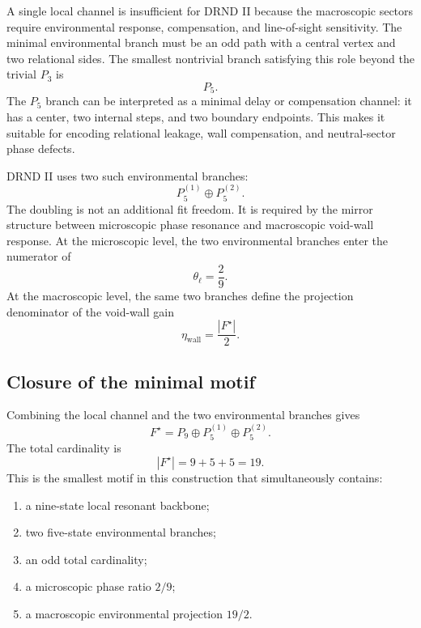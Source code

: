 \documentclass[12pt]{iopart}
\begin{document}
A single local channel is insufficient for DRND II because the macroscopic sectors require environmental response, compensation, and line-of-sight sensitivity. The minimal environmental branch must be an odd path with a central vertex and two relational sides. The smallest nontrivial branch satisfying this role beyond the trivial \(P_3\) is
\begin{equation}
P_5.
\end{equation}
The \(P_5\) branch can be interpreted as a minimal delay or compensation channel: it has a center, two internal steps, and two boundary endpoints. This makes it suitable for encoding relational leakage, wall compensation, and neutral-sector phase defects.

DRND II uses two such environmental branches:
\begin{equation}
P_5^{(1)}\oplus P_5^{(2)}.
\end{equation}
The doubling is not an additional fit freedom. It is required by the mirror structure between microscopic phase resonance and macroscopic void-wall response. At the microscopic level, the two environmental branches enter the numerator of
\begin{equation}
\theta_\ell=\frac{2}{9}.
\end{equation}
At the macroscopic level, the same two branches define the projection denominator of the void-wall gain
\begin{equation}
\eta_{\mathrm{wall}}
=
\frac{|F^\star|}{2}.
\end{equation}

\subsection{Closure of the minimal motif}

Combining the local channel and the two environmental branches gives
\begin{equation}
F^\star
=
P_9\oplus P_5^{(1)}\oplus P_5^{(2)}.
\end{equation}
The total cardinality is
\begin{equation}
|F^\star|
=
9+5+5
=
19.
\end{equation}
This is the smallest motif in this construction that simultaneously contains:
\begin{enumerate}
    \item a nine-state local resonant backbone;
    \item two five-state environmental branches;
    \item an odd total cardinality;
    \item a microscopic phase ratio \(2/9\);
    \item a macroscopic environmental projection \(19/2\).
\end{enumerate}
\end{document}
